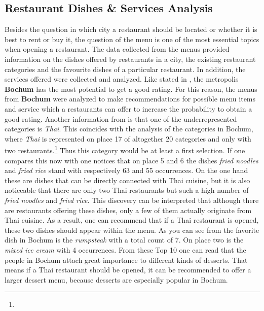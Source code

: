 \subsection{Restaurant Dishes \& Services Analysis}
\label{subsec:menu}
Besides the question in which city a restaurant should be located or whether it is best to rent or buy it,
the question of the menu is one of the most essential topics when opening a restaurant.
\newline
The data collected from the menus provided information on the dishes offered by restaurants in a city,
the existing restaurant categories and the favourite dishes of a particular restaurant.
In addition, the services offered were collected and analyzed.
\newline
Like stated in , the metropolis \textbf{Bochum} has the most potential to get a good rating.
For this reason, the menus from \textbf{Bochum} were analyzed to make recommendations for possible menu items and service which a restaurants can offer
to increase the probability to obtain a good rating.
\newline
Another information from  is that one of the underrepresented categories is \textit{Thai}.
This coincides with the analysis of the categories in Bochum, where \textit{Thai} is represented on place 17 of altogether 20 categories and only with two restaurants.\footnote{}
Thus this category would be at least a first selection.
If one compares this now with  one notices that on place 5 and 6 the dishes \textit{fried noodles} and \textit{fried rice} stand with respectively 63 and 55 occurrences.
On the one hand these are dishes that can be directly connected with Thai cuisine,
but it is also noticeable that there are only two Thai restaurants but such a high number of \textit{fried noodles} and \textit{fried rice}.
This discovery can be interpreted that although there are restaurants offering these dishes, only a few of them actually originate from Thai cuisine.
As a result, one can recommend that if a Thai restaurant is opened, these two dishes should appear within the menu.
As you can see from  the favorite dish in Bochum is the \textit{rumpsteak} with a total count of 7.
On place two is the \textit{mixed ice cream} with 4 occurrences.
From these Top 10 one can read that the people in Bochum attach great importance to different kinds of desserts.
That means if a Thai restaurant should be opened, it can be recommended to offer a larger dessert menu, because desserts are especially popular in Bochum.
\newline
